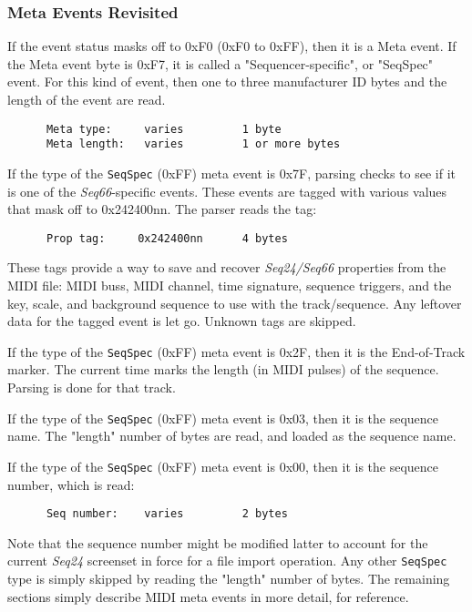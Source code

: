 \subsubsection{Meta Events Revisited}
\label{subsubsec:midi_format_meta_events_revisited}

   If the event status masks off to 0xF0 (0xF0 to 0xFF), then it is a Meta
   event.  If the Meta event byte is 0xF7, it is called a "Sequencer-specific",
   or "SeqSpec" event.  For this kind of event, then one to three manufacturer
   ID bytes and the length of the event are read.

   \begin{verbatim}
      Meta type:     varies         1 byte
      Meta length:   varies         1 or more bytes
   \end{verbatim}

   If the type of the
   \texttt{SeqSpec} (0xFF) meta event is 0x7F, parsing checks to see
   if it is one of the \textsl{Seq66}-specific events.  These events are tagged
   with various values that mask off to 0x242400nn.  The parser reads the
   tag:

   \begin{verbatim}
      Prop tag:     0x242400nn      4 bytes
   \end{verbatim}

   These tags provide a way to save and recover \textsl{Seq24/Seq66} properties
   from the MIDI file: MIDI buss, MIDI channel, time signature, sequence
   triggers, and the key, scale, and background sequence to use with the
   track/sequence.  Any leftover data for the tagged event is let go.
   Unknown tags are skipped.

   If the type of the
   \texttt{SeqSpec} (0xFF) meta event is 0x2F, then it is the
   End-of-Track marker.  The current time marks the length (in MIDI pulses) of
   the sequence.  Parsing is done for that track.

   If the type of the
   \texttt{SeqSpec} (0xFF) meta event is 0x03, then it is the
   sequence name.  The "length" number of bytes are read, and loaded as the
   sequence name.

   If the type of the
   \texttt{SeqSpec} (0xFF) meta event is 0x00, then it is the
   sequence number, which is read:

   \begin{verbatim}
      Seq number:    varies         2 bytes
   \end{verbatim}

   Note that the sequence number might be modified latter to account for the
   current \textsl{Seq24} screenset in force for a file import operation.
   Any other \texttt{SeqSpec} type is simply skipped by reading the "length"
   number of bytes.
   The remaining sections simply describe MIDI meta events in more detail, for
   reference.

